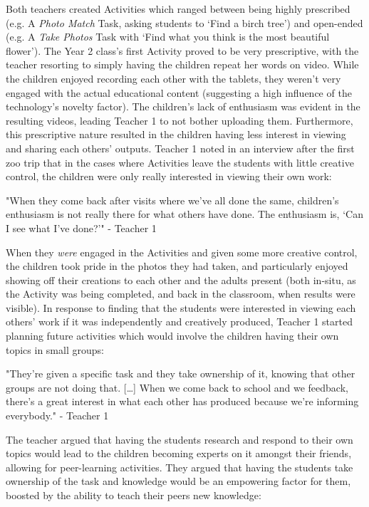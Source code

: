Both teachers created Activities which ranged between being highly prescribed (e.g. A \textit{Photo Match} Task, asking students to ‘Find a birch tree’) and open-ended (e.g. A \textit{Take Photos} Task with ‘Find what you think is the most beautiful flower’). The Year 2 class's first Activity proved to be very prescriptive, with the teacher resorting to simply having the children repeat her words on video. While the children enjoyed recording each other with the tablets, they weren't very engaged with the actual educational content (suggesting a high influence of the technology’s novelty factor). The children's lack of enthusiasm was evident in the resulting videos, leading Teacher 1 to not bother uploading them. Furthermore, this prescriptive nature resulted in the children having less interest in viewing and sharing each others' outputs. Teacher 1 noted in an interview after the first zoo trip that in the cases where Activities leave the students with little creative control, the children were only really interested in viewing their own work: 

\begin{displayquote}
"When they come back after visits where we've all done the same, children's enthusiasm is not really there for what others have done. The enthusiasm is, `Can I see what I've done?'" - Teacher 1
\end{displayquote}

When they \textit{were} engaged in the Activities and given some more creative control, the children took pride in the photos they had taken, and particularly enjoyed showing off their creations to each other and the adults present (both in-situ, as the Activity was being completed, and back in the classroom, when results were visible). In response to finding that the students were interested in viewing each others' work if it was independently and creatively produced, Teacher 1 started planning future activities which would involve the children having their own topics in small groups: 

\begin{displayquote}
"They’re given a specific task and they take ownership of it, knowing that other groups are not doing that. […] When we come back to school and we feedback, there’s a great interest in what each other has produced because we’re informing everybody." - Teacher 1
\end{displayquote}

The teacher argued that having the students research and respond to their own topics would lead to the children becoming experts on it amongst their friends, allowing for peer-learning activities. They argued that having the students take ownership of the task and knowledge would be an empowering factor for them, boosted by the ability to teach their peers new knowledge:

